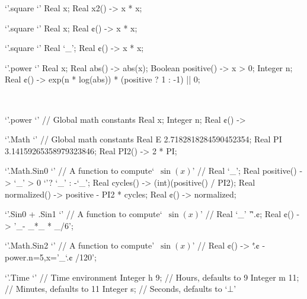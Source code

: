 \begin{reap}
`'.square {`'
  Real x;
  Real x2() -> x * x;
}
\end{reap}

\begin{reap}
`'.square {`'
  Real x;
  Real ¢() -> x * x;
}
\end{reap}

\begin{reap}
`'.square {`'
  Real `\_';
  Real ¢() -> x * x;
}
\end{reap}

\begin{reap}
`'.power {`'
  Real x;
  Real abs() -> abs(x);
  Boolean positive() -> x > 0;
  Integer n;
  Real ¢() -> exp(n * log(abs)) * (positive ? 1 : -1) || 0;
}
\end{reap}

\
\begin{reap}
`'.power {`' // Global math constants
  Real x;
  Integer n;
  Real ¢() ->
}
\end{reap}

\begin{reap}
`'.Math {`' // Global math constants
  Real E 2.7182818284590452354;
  Real PI 3.14159265358979323846;
  Real PI2() -> 2 * PI;
}
\end{reap}

\begin{reap}
`'.Math.Sin0 {`' // A function to compute`~$\sin(x)$' //
  Real `\_';
  Real positive() -> `\_' > 0 `'? `\_' : -`\_';
  Real cycles() -> (int)(positive() / PI2);
  Real normalized() -> positive - PI2 * cycles;
  Real ¢() -> normalized;
}
\end{reap}

\begin{reap}
`'.Sin0 + .Sin1 {`' // A function to compute`~$\sin(x)$' //
  Real `\_' '\^'.¢;
  Real ¢() -> '\_- \_*\_ * \_/6';
}
\end{reap}

\begin{reap}
`'.Math.Sin2 {`' // A function to compute'~$\sin(x)$' //
  Real ¢() -> `\^.¢ - power.n=5,x='\_`.¢ /120';
}
\end{reap}

\begin{reap}
`'.Time {`' // Time environment
  Integer h 9; // Hours, defaults to 9
  Integer m 11; // Minutes, defaults to 11
  Integer s; // Seconds, defaults to `$⊥$'
}
\end{reap}

